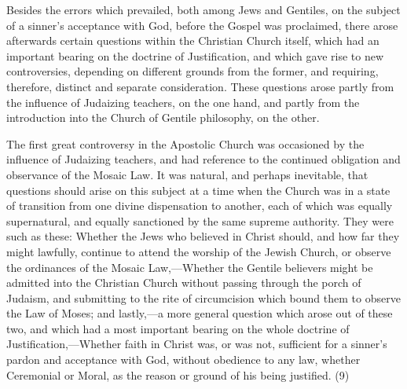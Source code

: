 \documentclass[
]{book}
\begin{document}
Besides the errors which prevailed, both among Jews and Gentiles, on the subject of a sinner's acceptance with God, before the Gospel was proclaimed, there arose afterwards certain questions within the Christian Church itself, which had an important bearing on the doctrine of Justification, and which gave rise to new controversies, depending on different grounds from the former, and requiring, therefore, distinct and separate consideration. These questions arose partly from the influence of Judaizing teachers, on the one hand, and partly from the introduction into the Church of Gentile philosophy, on the other.

The first great controversy in the Apostolic Church was occasioned by the influence of Judaizing teachers, and had reference to the continued obligation and observance of the Mosaic Law. It was natural, and perhaps inevitable, that questions should arise on this subject at a time when the Church was in a state of transition from one divine dispensation to another, each of which was equally supernatural, and equally sanctioned by the same supreme authority. They were such as these: Whether the Jews who believed in Christ should, and how far they might lawfully, continue to attend the worship of the Jewish Church, or observe the ordinances of the Mosaic Law,---Whether the Gentile believers might be admitted into the Christian Church without passing through the porch of Judaism, and submitting to the rite of circumcision which bound them to observe the Law of Moses; and lastly,---a more general question which arose out of these two, and which had a most important bearing on the whole doctrine of Justification,---Whether faith in Christ was, or was not, sufficient for a sinner's pardon and acceptance with God, without obedience to any law, whether Ceremonial or Moral, as the reason or ground of his being justified. (9)
\end{document}
